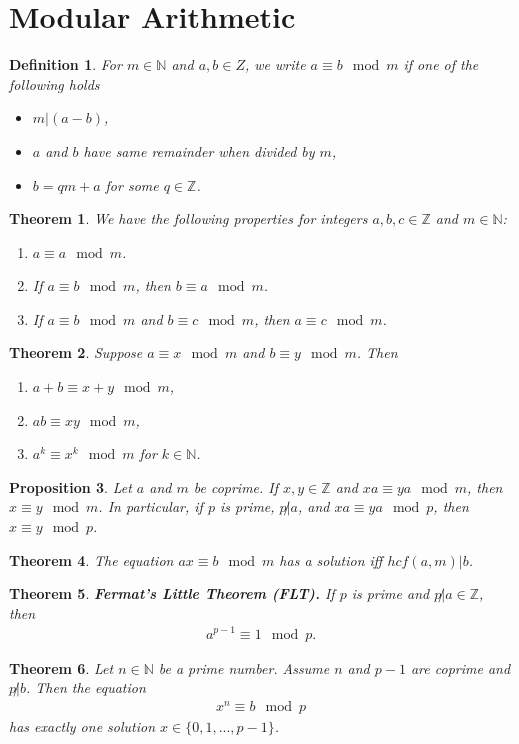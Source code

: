 \documentclass{article}
\theoremstyle{sltheorem}
\newtheorem{definition}{Definition}[section]
\newtheorem{theorem}{Theorem}[section]
\newtheorem{proposition}[theorem]{Proposition}
\newcommand{\N}{\mathbb{N}}
\newcommand{\Z}{\mathbb{Z}}
\begin{document}
\section{Modular Arithmetic}
\begin{definition}
    For $m\in\N$ and $a,b\in Z$, we write $a\equiv b \mod m$ if one of the following holds
    \begin{itemize}
        \item $m|(a-b)$,
        \item $a$ and $b$ have same remainder when divided by $m$,
        \item $b=qm+a$ for some $q\in\Z$.
    \end{itemize}
\end{definition}
\begin{theorem}
    We have the following properties for integers $a,b,c\in\Z$ and $m\in\N$:
    \begin{enumerate}
        \item $a\equiv a \mod m$.
        \item If $a\equiv b \mod m$, then $b\equiv a \mod m$.
        \item If $a\equiv b \mod m$ and $b\equiv c \mod m$, then $a\equiv c \mod m$.
    \end{enumerate}
\end{theorem}
\begin{theorem}
    Suppose $a\equiv x \mod m$ and $b\equiv y \mod m$. Then
    \begin{enumerate}
        \item $a+b\equiv x+y \mod m$,
        \item $ab \equiv xy \mod m$,
        \item $a^k \equiv x^k \mod m$ for $k\in \N$.
    \end{enumerate}
\end{theorem}
\begin{proposition}
    Let $a$ and $m$ be coprime. If $x,y\in \Z$ and $xa\equiv ya \mod m$, then $x\equiv y \mod m$. In particular, if $p$ is prime, $p\not|a$, and $xa\equiv ya \mod p$, then $x\equiv y \mod p$. 
\end{proposition}
\begin{theorem}
    The equation $ax\equiv b \mod m$ has a solution iff $hcf(a,m)|b$.
\end{theorem}
\begin{theorem}
    \textbf{Fermat's Little Theorem (FLT).} If $p$ is prime and $p\not|a\in\Z$, then 
    \begin{align*}
        a^{p-1}\equiv 1 \mod p.
    \end{align*}
\end{theorem}
\begin{theorem}
    Let $n\in\N$ be a prime number. Assume $n$ and $p-1$ are coprime and $p\not|b$. Then the equation
    \begin{align*}
        x^n\equiv b \mod p
    \end{align*}
    has exactly one solution $x\in\{0, 1, ..., p-1\}$.
\end{theorem}
\end{document}
